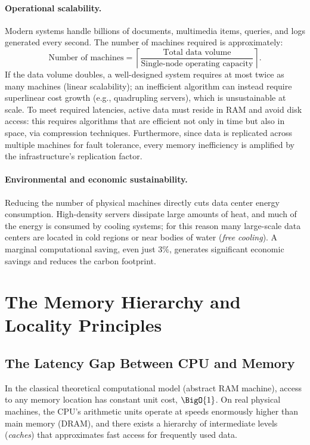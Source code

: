 \paragraph{Operational scalability.} Modern systems handle billions of documents, multimedia items, queries, and logs generated every second. The number of machines required is approximately:
\[
\text{Number of machines} = \left\lceil \frac{\text{Total data volume}}{\text{Single-node operating capacity}} \right\rceil.
\]
If the data volume doubles, a well-designed system requires at most twice as many machines (linear scalability); an inefficient algorithm can instead require superlinear cost growth (e.g., quadrupling servers), which is unsustainable at scale. To meet required latencies, active data must reside in RAM and avoid disk access: this requires algorithms that are efficient not only in time but also in space, via compression techniques. Furthermore, since data is replicated across multiple machines for fault tolerance, every memory inefficiency is amplified by the infrastructure's replication factor.

\paragraph{Environmental and economic sustainability.} Reducing the number of physical machines directly cuts data center energy consumption. High-density servers dissipate large amounts of heat, and much of the energy is consumed by cooling systems; for this reason many large-scale data centers are located in cold regions or near bodies of water (\textit{free cooling}). A marginal computational saving, even just $3\%$, generates significant economic savings and reduces the carbon footprint.

\FloatBarrier
\section{The Memory Hierarchy and Locality Principles}

\subsection{The Latency Gap Between CPU and Memory}

In the classical theoretical computational model (abstract RAM machine), access to any memory location has constant unit cost, $\BigO{1}$. On real physical machines, the CPU's arithmetic units operate at speeds enormously higher than main memory (DRAM), and there exists a hierarchy of intermediate levels (\textit{caches}) that approximates fast access for frequently used data.

